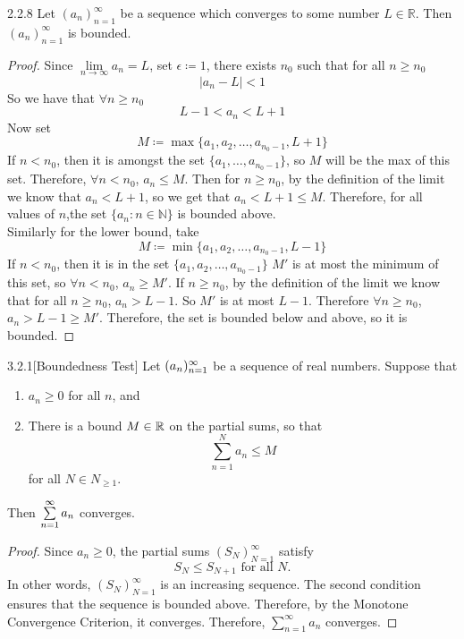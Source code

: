 \documentclass[openany]{report}
\begin{document}
        \begin{manualprop}{2.2.8}
            Let $(a_n)_{n=1}^\infty$ be a sequence which converges to some number $L \in \mathbb{R}$. Then $(a_n)_{n=1}^\infty$ is bounded.
        \end{manualprop}
        \begin{proof}
            Since $\lim\limits_{n\rightarrow\infty} a_n = L$, set $\epsilon \coloneqq 1$, there exists $n_0$ such that for all $n \geq n_0$
            \[|a_n - L| < 1\]
            So we have that $\forall n \geq n_0$
            \[L - 1 < a_n < L + 1\]
            Now set
            \[M \coloneqq \max\{a_1, a_2, \ldots, a_{n_0-1}, L+1\}\]
            If $n < n_0$, then it is amongst the set $\{a_1, \ldots, a_{n_0-1}\}$, so $M$ will be the max of this set. Therefore, $\forall n < n_0$, $a_n \leq M$. Then for $n \geq n_0$, by the definition of the limit we know that $a_n < L + 1$, so we get that $a_n < L + 1 \leq M$. Therefore, for all values of $n$,the set $\{a_n: n \in \mathbb{N}\}$ is bounded above.\\[1ex]
            Similarly for the lower bound, take
            \[M \coloneqq \min\{a_1, a_2, \ldots, a_{n_0 -1}, L - 1\}\]
            If $n < n_0$, then it is in the set $\{a_1, a_2, \ldots, a_{n_0-1}\}$
            $M'$ is at most the minimum of this set, so $\forall n < n_0$, $a_n \geq M'$. If $n \geq n_0$, by the definition of the limit we know that for all $n \geq n_0$, $a_n > L - 1$. So $M'$ is at most $L - 1$. Therefore $\forall n \geq n_0$, $a_n > L - 1 \geq M'$. Therefore, the set is bounded below and above, so it is bounded.
   \end{proof}

   \begin{manualprop}{3.2.1}[Boundedness Test]
    Let $({a}_n)_{n=1}^\infty$ be a sequence of real numbers. Suppose that
    \begin{enumerate}[label=(\roman*)]
        \item $a_n \geq 0$ for all $n$, and
        \item There is a bound $M \in \mathbb{R}$ on the partial sums, so that
        \[\sum_{n=1}^N a_n \leq M\]
        for all $N \in N_{\geq 1}$.
    \end{enumerate}
    Then $\sum\limits_{n=1}^\infty a_n$ converges.
\end{manualprop}
\begin{proof}
    Since $a_n \geq 0$, the partial sums $(S_N)_{N=1}^\infty$ satisfy
    \[S_N \leq S_{N+1} \text{ for all $N$.}\]
    In other words, $(S_N)^\infty_{N=1}$ is an increasing sequence. The second condition ensures that the sequence is bounded above. Therefore, by the Monotone Convergence Criterion, it converges. Therefore, $\sum\limits_{n=1}^\infty a_n$ converges.
\end{proof}
\end{document}
